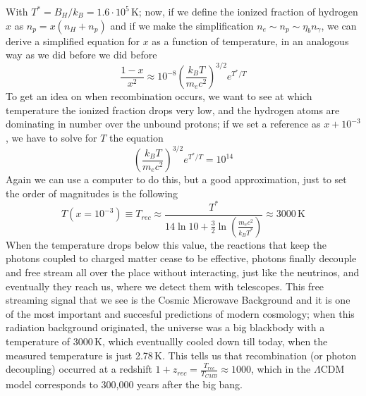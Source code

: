 \documentclass[11pt, a4paper,oneside,openright]{book}
\numberwithin{equation}{section}
\begin{document}
With $T^*=B_H/k_B=1.6\cdot 10^5$\,K; now, if we define the ionized fraction of hydrogen $x$ as $n_p=x(n_H+n_p)$ and if we make the simplification $n_e\sim n_p\sim \eta_b n_\gamma$, we can derive a simplified equation for $x$ as a function of temperature, in an analogous way as we did before we did before
\begin{equation}
\frac{1-x}{x^2}\approx 10^{-8}\left(\frac{k_BT}{m_ec^2}\right)^{3/2}e^{T^*/T}
\end{equation}
To get an idea on when recombination occurs, we want to see at which temperature the ionized fraction drops very low, and the hydrogen atoms are dominating in number over the unbound protons; if we set a reference as $x+10^{-3}$, we have to solve for $T$ the equation
\begin{equation}
\left(\frac{k_BT}{m_ec^2}\right)^{3/2}e^{T^*/T}=10^{14}
\end{equation}
Again we can use a computer to do this, but a good approximation, just to set the order of magnitudes is the following
\begin{equation}
T(x=10^{-3})\equiv T_{rec}\approx \frac{T^*}{14\ln{10}+\frac{3}{2}\ln{\left(\frac{m_ec^2}{k_BT^*}\right)}}\approx 3000\, \mathrm{K}
\end{equation}
When the temperature drops below this value, the reactions that keep the photons coupled to charged matter cease to be effective, photons finally decouple and free stream all over the place without interacting, just like the neutrinos, and eventually they reach us, where we detect them with telescopes. This free streaming signal that we see is the Cosmic Microwave Background and it is one of the most important and succesful predictions of modern cosmology; when this radiation background originated, the universe was a big blackbody with a temperature of 3000\,K, which eventuallly cooled down till today, when the measured temperature is just 2.78\,K. This tells us that recombination (or photon decoupling) occurred at a redshift $1+z_{rec}=\frac{T_{rec}}{T_{CMB}}\approx 1000$, which in the $\Lambda$CDM model corresponds to 300,000 years after the big bang.  
\end{document}
